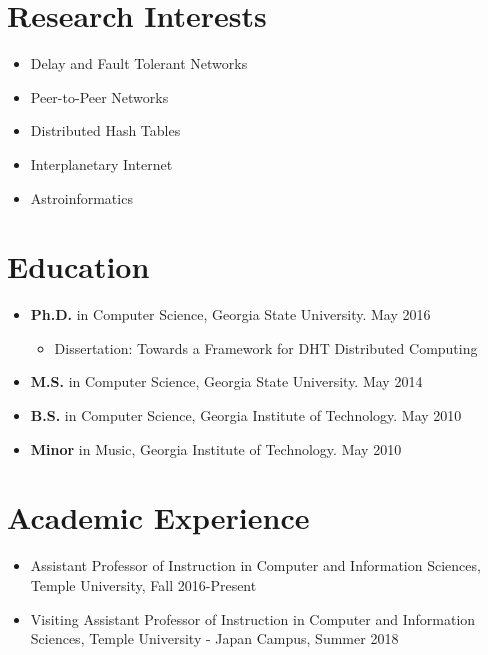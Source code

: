 \documentclass{res}
\begin{document}
\begin{resume} 

\section{Research Interests}
	\begin{itemize}
    \item Delay and Fault Tolerant Networks
    \item Peer-to-Peer Networks
	\item Distributed Hash Tables
	\item Interplanetary Internet 
	\item Astroinformatics
	
	\end{itemize}
\section{Education}          
    \begin{itemize}    
    \item {\bf Ph.D.} in Computer Science, Georgia State University. May 2016
    \begin{itemize}
    	\item Dissertation: Towards a Framework for DHT Distributed Computing
    \end{itemize}
    \item {\bf M.S.} in Computer Science, Georgia State University. May 2014 
    \item {\bf B.S.} in Computer Science, Georgia Institute of Technology. May 2010
	\item {\bf Minor} in Music, Georgia Institute of Technology. May 2010
    
    \end{itemize}   


\section{Academic Experience}
	\begin{itemize}
		\item  Assistant Professor of Instruction in Computer and Information Sciences, Temple University, Fall 2016-Present
		\item  Visiting Assistant Professor of Instruction in Computer and Information Sciences, Temple University - Japan Campus, Summer 2018
		
	\end{itemize}



\end{resume}
\end{document}
